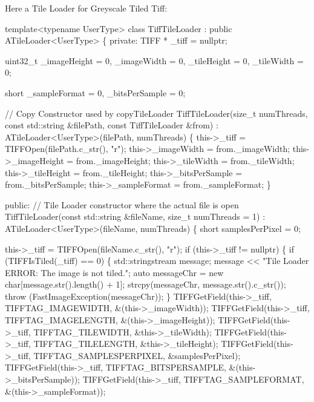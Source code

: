 Here a Tile Loader for Greyscale Tiled Tiff\+:


\begin{DoxyCode}
\textcolor{keyword}{template}<\textcolor{keyword}{typename} UserType>
\textcolor{keyword}{class }TiffTileLoader : \textcolor{keyword}{public} ATileLoader<UserType> \{
 \textcolor{keyword}{private}:
  TIFF *
      \_tiff = \textcolor{keyword}{nullptr};

  uint32\_t
      \_imageHeight = 0,
      \_imageWidth = 0,
      \_tileHeight = 0,
      \_tileWidth = 0;

  \textcolor{keywordtype}{short}
      \_sampleFormat = 0,
      \_bitsPerSample = 0;

  \textcolor{comment}{// Copy Constructor used by copyTileLoader}
  TiffTileLoader(\textcolor{keywordtype}{size\_t} numThreads, \textcolor{keyword}{const} std::string &filePath, \textcolor{keyword}{const} TiffTileLoader &from)
      : ATileLoader<UserType>(filePath, numThreads) \{
    this->\_tiff = TIFFOpen(filePath.c\_str(), \textcolor{stringliteral}{"r"});
    this->\_imageWidth = from.\_imageWidth;
    this->\_imageHeight = from.\_imageHeight;
    this->\_tileWidth = from.\_tileWidth;
    this->\_tileHeight = from.\_tileHeight;
    this->\_bitsPerSample = from.\_bitsPerSample;
    this->\_sampleFormat = from.\_sampleFormat;
  \}

 \textcolor{keyword}{public}:
  \textcolor{comment}{// Tile Loader constructor where the actual file is open}
  TiffTileLoader(\textcolor{keyword}{const} std::string &fileName, \textcolor{keywordtype}{size\_t} numThreads = 1) : ATileLoader<UserType>(fileName,
                                                                                             numThreads) \{
    \textcolor{keywordtype}{short} samplesPerPixel = 0;

    this->\_tiff = TIFFOpen(fileName.c\_str(), \textcolor{stringliteral}{"r"});
    \textcolor{keywordflow}{if} (this->\_tiff != \textcolor{keyword}{nullptr}) \{
      \textcolor{keywordflow}{if} (TIFFIsTiled(\_tiff) == 0) \{
        std::stringstream message;
        message << \textcolor{stringliteral}{"Tile Loader ERROR: The image is not tiled."};
        \textcolor{keyword}{auto} messageChr = \textcolor{keyword}{new} \textcolor{keywordtype}{char}[message.str().length() + 1];
        strcpy(messageChr, message.str().c\_str());
        \textcolor{keywordflow}{throw} (FastImageException(messageChr));
      \}
      TIFFGetField(this->\_tiff, TIFFTAG\_IMAGEWIDTH, &(this->\_imageWidth));
      TIFFGetField(this->\_tiff, TIFFTAG\_IMAGELENGTH, &(this->\_imageHeight));
      TIFFGetField(this->\_tiff, TIFFTAG\_TILEWIDTH, &this->\_tileWidth);
      TIFFGetField(this->\_tiff, TIFFTAG\_TILELENGTH, &this->\_tileHeight);
      TIFFGetField(this->\_tiff, TIFFTAG\_SAMPLESPERPIXEL, &samplesPerPixel);
      TIFFGetField(this->\_tiff, TIFFTAG\_BITSPERSAMPLE, &(this->\_bitsPerSample));
      TIFFGetField(this->\_tiff, TIFFTAG\_SAMPLEFORMAT, &(this->\_sampleFormat));


\end{DoxyCode}
